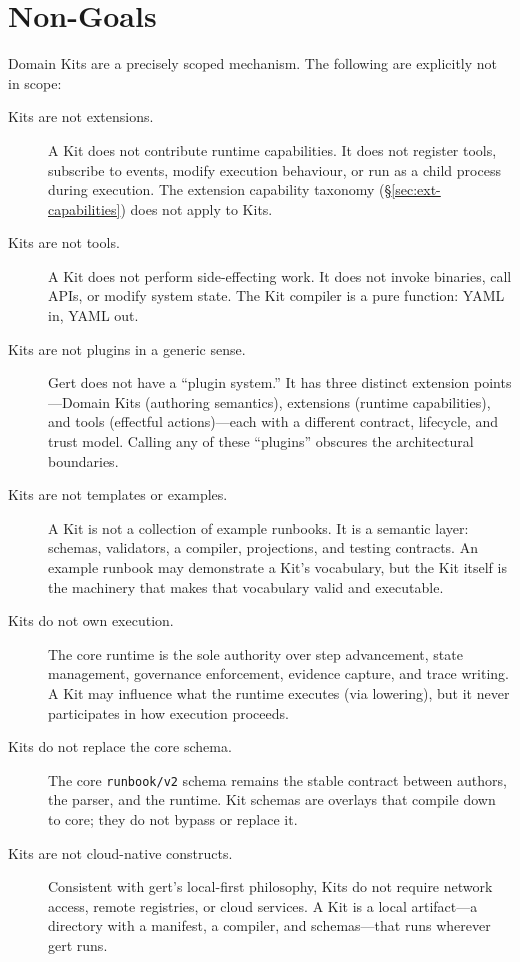 \section{Non-Goals}
\label{sec:kit-nongoals}

Domain Kits are a precisely scoped mechanism.  The following are explicitly not
in scope:

\begin{description}
  \item[Kits are not extensions.] A Kit does not contribute runtime
    capabilities.  It does not register tools, subscribe to events, modify
    execution behaviour, or run as a child process during execution.  The
    extension capability taxonomy (\S\ref{sec:ext-capabilities}) does not
    apply to Kits.

  \item[Kits are not tools.] A Kit does not perform side-effecting work.  It
    does not invoke binaries, call APIs, or modify system state.  The Kit
    compiler is a pure function: YAML in, YAML out.

  \item[Kits are not plugins in a generic sense.] Gert does not have a
    ``plugin system.''  It has three distinct extension points---Domain Kits
    (authoring semantics), extensions (runtime capabilities), and tools
    (effectful actions)---each with a different contract, lifecycle, and trust
    model.  Calling any of these ``plugins'' obscures the architectural
    boundaries.

  \item[Kits are not templates or examples.] A Kit is not a collection of
    example runbooks.  It is a semantic layer: schemas, validators, a compiler,
    projections, and testing contracts.  An example runbook may demonstrate a
    Kit's vocabulary, but the Kit itself is the machinery that makes that
    vocabulary valid and executable.

  \item[Kits do not own execution.] The core runtime is the sole authority
    over step advancement, state management, governance enforcement, evidence
    capture, and trace writing.  A Kit may influence what the runtime executes
    (via lowering), but it never participates in how execution proceeds.

  \item[Kits do not replace the core schema.] The core \texttt{runbook/v2}
    schema remains the stable contract between authors, the parser, and the
    runtime.  Kit schemas are overlays that compile down to core; they do not
    bypass or replace it.

  \item[Kits are not cloud-native constructs.] Consistent with gert's
    local-first philosophy, Kits do not require network access, remote
    registries, or cloud services.  A Kit is a local artifact---a directory
    with a manifest, a compiler, and schemas---that runs wherever gert runs.
\end{description}
